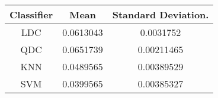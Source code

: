 \begin{tabular}{|c|c|c|}
 \hline 
Classifier & Mean & Standard Deviation. \\ 
 \hline 
LDC & 0.0613043 & 0.0031752 \\ 
 \hline 
QDC & 0.0651739 & 0.00211465 \\ 
 \hline 
KNN & 0.0489565 & 0.00389529 \\ 
 \hline 
SVM & 0.0399565 & 0.00385327 \\ 
 \hline 
\end{tabular}